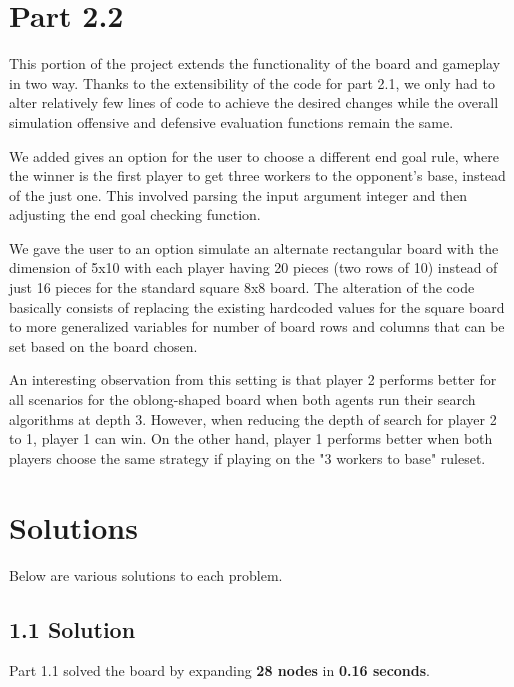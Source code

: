 \documentclass{article}
\begin{document}
\section{Part 2.2}
This portion of the project extends the functionality of the board and gameplay in two way. Thanks to the extensibility of the code for part 2.1, we only had to alter relatively few lines of code to achieve the desired changes while the overall simulation offensive and defensive evaluation functions remain the same. 

We added gives an option for the user to choose a different end goal rule, where the winner is the first player to get three workers to the opponent’s base, instead of the just one. This involved parsing the input argument integer and then adjusting the end goal checking function.

We gave the user to an option simulate an alternate rectangular board with the dimension of 5x10 with each player having 20 pieces (two rows of 10) instead of just 16 pieces for the standard square 8x8 board. The alteration of the code basically consists of replacing the existing hardcoded values for the square board to more generalized variables for number of board rows and columns that can be set based on the board chosen.

An interesting observation from this setting is that player 2 performs better for all scenarios for the oblong-shaped board when both agents run their search algorithms at depth 3. However, when reducing the depth of search for player 2 to 1, player 1 can win. On the other hand, player 1 performs better when both players choose the same strategy if playing on the "3 workers to base" ruleset.

\newpage

\section{Solutions}
\label{sec:solutions}
Below are various solutions to each problem.

\subsection{1.1 Solution}
Part 1.1 solved the board by expanding \textbf{28 nodes} in \textbf{0.16 seconds}.
\end{document}
